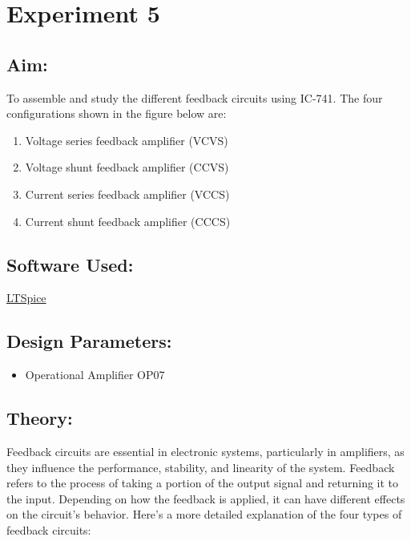 \documentclass[a4paper,12pt]{report}
\begin{document}
  \newpage

\section{Experiment 5}

\subsection*{Aim:}
  \hspace{20pt}To assemble and study the different feedback circuits using IC-741. The four configurations shown in the figure below are:
  \begin{enumerate}
      \item Voltage series feedback amplifier (VCVS)
      \item Voltage shunt feedback amplifier (CCVS)
      \item Current series feedback amplifier (VCCS)
      \item Current shunt feedback amplifier (CCCS)
  \end{enumerate}

  \vspace{0.3cm}

\subsection*{Software Used:}
  \hspace{20pt}\href{https://www.analog.com/en/design-center/design-tools-and-calculators/ltspice-simulator.html}{LTSpice}
  \vspace{0.3cm}

\subsection*{Design Parameters:}
  \hspace{20pt}\begin{itemize}
      \item Operational Amplifier OP07
  \end{itemize}
  \vspace{0.3cm}

\subsection*{Theory:}
  \hspace{20pt}Feedback circuits are essential in electronic systems, particularly in amplifiers, as they influence the performance, stability, and linearity of the system. Feedback refers to the process of taking a portion of the output signal and returning it to the input. Depending on how the feedback is applied, it can have different effects on the circuit's behavior. Here's a more detailed explanation of the four types of feedback circuits:
\end{document}
